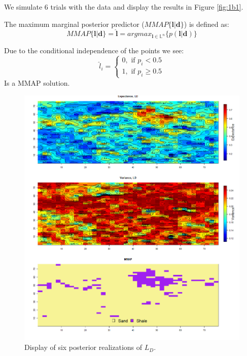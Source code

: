 \documentclass{article}
\newcommand{\vect}[1]{\ensuremath{\boldsymbol{\mathbf{#1}}}}
\begin{document}
	
	We simulate 6 trials with the data and display the results in Figure \ref{fig:1b1}. 
	
	The maximum marginal posterior predictor ($MMAP\lbrace \vect l | \vect d \rbrace$) is defined as: 
	\begin{equation}
		MMAP\lbrace \vect l | \vect d \rbrace = \vect{\hat l} = argmax_{\vect l \in \mathbb{L}^n}\lbrace p(\vect l | \vect d)\rbrace
	\end{equation}
	
	Due to the conditional independence of the points we see: 
	\begin{equation}
		\hat l_i = \begin{cases}
		0, \text{ if } p_i < 0.5 \\
		1, \text{ if } p_i \geq 0.5
		\end{cases}
	\end{equation}
	Is a MMAP solution. 
		\begin{figure}[h]	
		\begin{center} 
			\includegraphics[scale=0.48]{figure4.png}
		\end{center}
		\caption{Display of six posterior realizations of $L_D$.}
		\label{fig:1b2} 
	\end{figure}
	
\end{document}
